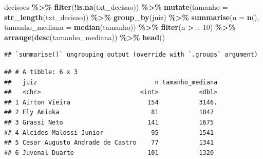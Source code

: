 \documentclass[
  10pt,
  ignorenonframetext,
]{beamer}
\newenvironment{Shaded}{\begin{snugshade}}{\end{snugshade}}
\newcommand{\DataTypeTok}[1]{\textcolor[rgb]{0.13,0.29,0.53}{#1}}
\newcommand{\DecValTok}[1]{\textcolor[rgb]{0.00,0.00,0.81}{#1}}
\newcommand{\KeywordTok}[1]{\textcolor[rgb]{0.13,0.29,0.53}{\textbf{#1}}}
\newcommand{\NormalTok}[1]{#1}
\newcommand{\OperatorTok}[1]{\textcolor[rgb]{0.81,0.36,0.00}{\textbf{#1}}}
\newcommand{\StringTok}[1]{\textcolor[rgb]{0.31,0.60,0.02}{#1}}
\begin{document}
\begin{frame}[fragile]{}
\protect\hypertarget{section-4}{}
\begin{Shaded}
\begin{Highlighting}[]
\NormalTok{decisoes }\OperatorTok{\%\textgreater{}\%}\StringTok{ }
\StringTok{  }\KeywordTok{filter}\NormalTok{(}\OperatorTok{!}\KeywordTok{is.na}\NormalTok{(txt\_decisao)) }\OperatorTok{\%\textgreater{}\%}\StringTok{ }
\StringTok{  }\KeywordTok{mutate}\NormalTok{(}\DataTypeTok{tamanho =} \KeywordTok{str\_length}\NormalTok{(txt\_decisao)) }\OperatorTok{\%\textgreater{}\%}\StringTok{ }
\StringTok{  }\KeywordTok{group\_by}\NormalTok{(juiz) }\OperatorTok{\%\textgreater{}\%}\StringTok{ }
\StringTok{  }\KeywordTok{summarise}\NormalTok{(}\DataTypeTok{n =} \KeywordTok{n}\NormalTok{(), }
            \DataTypeTok{tamanho\_mediana =} \KeywordTok{median}\NormalTok{(tamanho)) }\OperatorTok{\%\textgreater{}\%}\StringTok{ }
\StringTok{  }\KeywordTok{filter}\NormalTok{(n }\OperatorTok{\textgreater{}=}\StringTok{ }\DecValTok{10}\NormalTok{) }\OperatorTok{\%\textgreater{}\%}\StringTok{ }
\StringTok{  }\KeywordTok{arrange}\NormalTok{(}\KeywordTok{desc}\NormalTok{(tamanho\_mediana)) }\OperatorTok{\%\textgreater{}\%}
\StringTok{  }\KeywordTok{head}\NormalTok{()}
\end{Highlighting}
\end{Shaded}

\begin{verbatim}
## `summarise()` ungrouping output (override with `.groups` argument)
\end{verbatim}

\begin{verbatim}
## # A tibble: 6 x 3
##   juiz                                n tamanho_mediana
##   <chr>                           <int>           <dbl>
## 1 Airton Vieira                     154           3146.
## 2 Ely Amioka                         81           1847 
## 3 Grassi Neto                       141           1675 
## 4 Alcides Malossi Junior             95           1541 
## 5 Cesar Augusto Andrade de Castro    77           1341 
## 6 Juvenal Duarte                    101           1320
\end{verbatim}
\end{frame}
\end{document}

